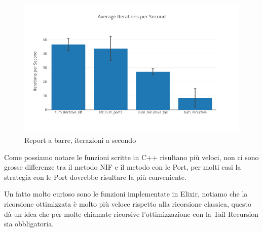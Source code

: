 \begin{figure}[!htp]
    \centering
    \includegraphics[keepaspectratio=true,scale=0.5]{images/newplot.png}
	\caption{Report a barre, iterazioni a secondo}
  	\label{fig:report_barre}
\end{figure}


Come possiamo notare le funzioni scritte in C++ risultano più veloci,
non ci sono grosse differenze tra il metodo NIF e il metodo con le Port,
per molti casi la strategia con le Port dovrebbe risultare la più conveniente.

Un fatto molto curioso sono le funzioni implementate in Elixir,
notiamo che la ricorsione ottimizzata è molto più veloce rispetto
alla ricorsione classica, questo dà un idea che per molte chiamate ricorsive
l'ottimizzazione con la Tail Recursion sia obbligatoria.
